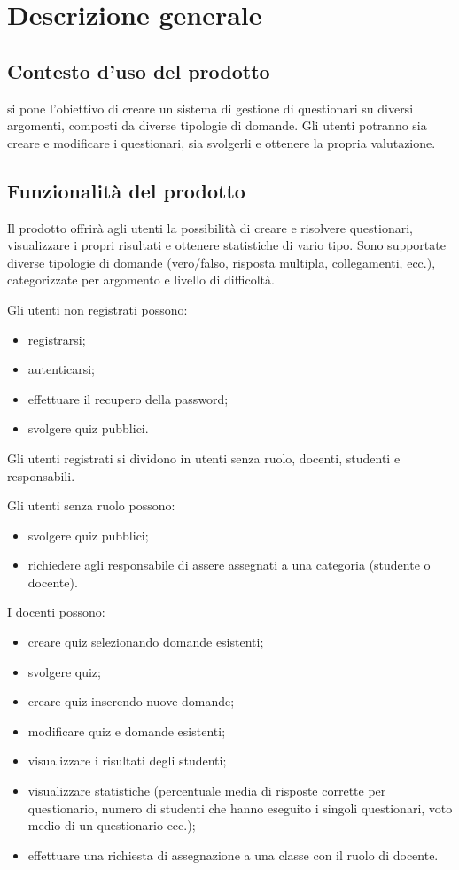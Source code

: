 \documentclass[a4paper, titlepage]{article}
\begin{document}
\newpage

\section{Descrizione generale}
\subsection{Contesto d'uso del prodotto}
 si pone l'obiettivo di creare un sistema di gestione di questionari su diversi argomenti, composti da diverse tipologie di domande. Gli utenti potranno sia creare e modificare i questionari, sia svolgerli e ottenere la propria valutazione.

\subsection{Funzionalità del prodotto}
Il prodotto offrirà agli utenti la possibilità di creare e risolvere questionari, visualizzare i propri risultati e ottenere statistiche di vario tipo. 
Sono supportate diverse tipologie di domande (vero/falso, risposta multipla, collegamenti, ecc.), categorizzate per argomento e livello di difficoltà. 

\bigskip

Gli utenti non registrati possono: 
\begin{itemize}
\item registrarsi;
\item autenticarsi;
\item effettuare il recupero della password;
\item svolgere quiz pubblici.
\end{itemize}

\bigskip

Gli utenti registrati si dividono in utenti senza ruolo, docenti, studenti e responsabili. 

\bigskip

Gli utenti senza ruolo possono:
\begin{itemize}
	\item svolgere quiz pubblici;
	\item richiedere agli responsabile di assere assegnati a una categoria (studente o docente).
\end{itemize}

\bigskip

I docenti possono:
\begin{itemize}
\item creare quiz selezionando domande esistenti;
\item svolgere quiz;
\item creare quiz inserendo nuove domande;
\item modificare quiz  e domande esistenti;
\item visualizzare i risultati degli studenti;
\item visualizzare statistiche (percentuale media di risposte corrette per questionario, numero di studenti che hanno eseguito i singoli questionari, voto medio di un questionario ecc.);
\item effettuare una richiesta di assegnazione a una classe con il ruolo di docente.
\end{itemize}
\end{document}
